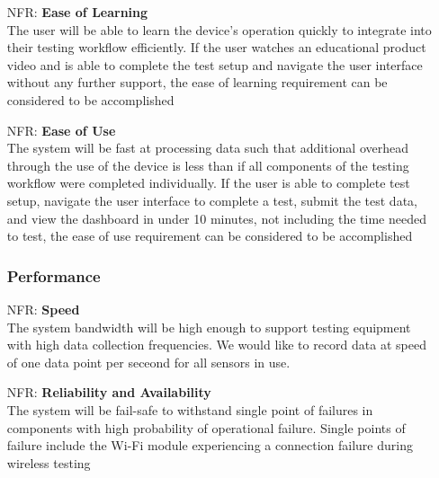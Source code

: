 \documentclass[12pt,titlepage]{article}
\newcounter{nfrnum} %
\begin{document}
\noindent\begin{itemize}

\subsubsection{Usability} 

    \item[NFR\refstepcounter{nfrnum}\thenfrnum:]
    \textbf{Ease of Learning}\\
    The user will be able to learn the device's operation quickly to integrate into their testing workflow efficiently. If the user watches an educational product video and is able to complete the test setup and navigate the user interface without any further support, the ease of learning requirement can be considered to be accomplished

    \item[NFR\refstepcounter{nfrnum}\thenfrnum:]
    \textbf{Ease of Use}\\
    The system will be fast at processing data such that additional overhead through the use of the device is less than if all components of the testing workflow were completed individually. If the user is able to complete test setup, navigate the user interface to complete a test, submit the test data, and view the dashboard in under 10 minutes, not including the time needed to test, the ease of use requirement can be considered to be accomplished

\subsubsection{Performance} 

    \item[NFR\refstepcounter{nfrnum}\thenfrnum:]
    \textbf{Speed}\\
    The system bandwidth will be high enough to support testing equipment with high data collection frequencies. We would like to record data at speed of one data point per seceond for all sensors in use.

    \item[NFR\refstepcounter{nfrnum}\thenfrnum:]
    \textbf{Reliability and Availability}\\
    The system will be fail-safe to withstand single point of failures in components with high probability of operational failure. Single points of failure include the Wi-Fi module experiencing a connection failure during wireless testing


\end{itemize}
\end{document}

